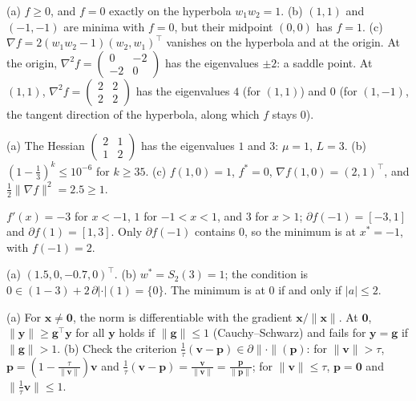 \documentclass[11pt]{article}
\newcommand{\norm}[1]{\lVert #1 \rVert}
\begin{document}
\begin{description}[leftmargin=0pt, itemsep=0.3em]
    \item[\ref{pr:two-layer-scalar}.] (a) $f \geq 0$, and $f = 0$ exactly on the hyperbola $w_1 w_2 = 1$. (b) $(1, 1)$ and $(-1, -1)$ are minima with $f = 0$, but their midpoint $(0, 0)$ has $f = 1$. (c) $\nabla f = 2(w_1 w_2 - 1)(w_2, w_1)^\top$ vanishes on the hyperbola and at the origin. At the origin, $\nabla^2 f = \begin{pmatrix} 0 & -2 \\ -2 & 0 \end{pmatrix}$ has the eigenvalues $\pm 2$: a saddle point. At $(1, 1)$, $\nabla^2 f = \begin{pmatrix} 2 & 2 \\ 2 & 2 \end{pmatrix}$ has the eigenvalues $4$ (for $(1, 1)$) and $0$ (for $(1, -1)$, the tangent direction of the hyperbola, along which $f$ stays $0$).
    \item[\ref{pr:strong-convexity}.] (a) The Hessian $\begin{pmatrix} 2 & 1 \\ 1 & 2 \end{pmatrix}$ has the eigenvalues $1$ and $3$: $\mu = 1$, $L = 3$. (b) $(1 - \frac{1}{3})^k \leq 10^{-6}$ for $k \geq 35$. (c) $f(1, 0) = 1$, $f^* = 0$, $\nabla f(1, 0) = (2, 1)^\top$, and $\frac{1}{2}\norm{\nabla f}^2 = 2.5 \geq 1$.
    \item[\ref{pr:subgradient-practice}.] $f'(x) = -3$ for $x < -1$, $1$ for $-1 < x < 1$, and $3$ for $x > 1$; $\partial f(-1) = [-3, 1]$ and $\partial f(1) = [1, 3]$. Only $\partial f(-1)$ contains $0$, so the minimum is at $x^* = -1$, with $f(-1) = 2$.
    \item[\ref{pr:soft-threshold-practice}.] (a) $(1.5, 0, -0.7, 0)^\top$. (b) $w^* = S_2(3) = 1$; the condition is $0 \in (1 - 3) + 2\,\partial|\cdot|(1) = \{0\}$. The minimum is at $0$ if and only if $|a| \leq 2$.
    \item[\ref{pr:group-lasso}.] (a) For $\mathbf{x} \neq \mathbf{0}$, the norm is differentiable with the gradient $\mathbf{x}/\norm{\mathbf{x}}$. At $\mathbf{0}$, $\norm{\mathbf{y}} \geq \mathbf{g}^\top\mathbf{y}$ for all $\mathbf{y}$ holds if $\norm{\mathbf{g}} \leq 1$ (Cauchy--Schwarz) and fails for $\mathbf{y} = \mathbf{g}$ if $\norm{\mathbf{g}} > 1$. (b) Check the criterion $\frac{1}{\tau}(\mathbf{v} - \mathbf{p}) \in \partial\norm{\cdot}(\mathbf{p})$: for $\norm{\mathbf{v}} > \tau$, $\mathbf{p} = (1 - \frac{\tau}{\norm{\mathbf{v}}})\mathbf{v}$ and $\frac{1}{\tau}(\mathbf{v} - \mathbf{p}) = \frac{\mathbf{v}}{\norm{\mathbf{v}}} = \frac{\mathbf{p}}{\norm{\mathbf{p}}}$; for $\norm{\mathbf{v}} \leq \tau$, $\mathbf{p} = \mathbf{0}$ and $\norm{\frac{1}{\tau}\mathbf{v}} \leq 1$.
\end{description}
\end{document}

